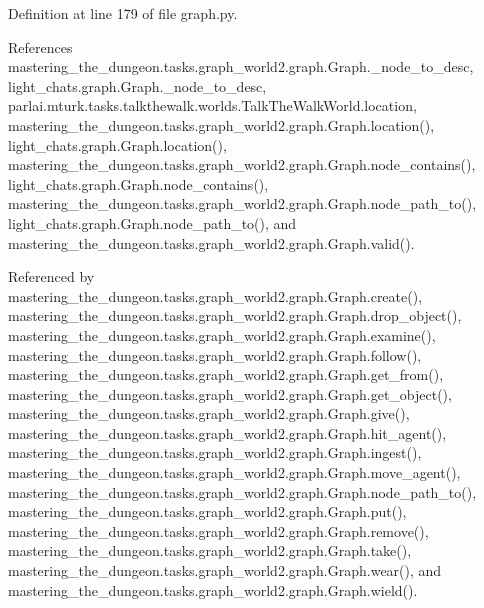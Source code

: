 Definition at line 179 of file graph.\+py.



References mastering\+\_\+the\+\_\+dungeon.\+tasks.\+graph\+\_\+world2.\+graph.\+Graph.\+\_\+node\+\_\+to\+\_\+desc, light\+\_\+chats.\+graph.\+Graph.\+\_\+node\+\_\+to\+\_\+desc, parlai.\+mturk.\+tasks.\+talkthewalk.\+worlds.\+Talk\+The\+Walk\+World.\+location, mastering\+\_\+the\+\_\+dungeon.\+tasks.\+graph\+\_\+world2.\+graph.\+Graph.\+location(), light\+\_\+chats.\+graph.\+Graph.\+location(), mastering\+\_\+the\+\_\+dungeon.\+tasks.\+graph\+\_\+world2.\+graph.\+Graph.\+node\+\_\+contains(), light\+\_\+chats.\+graph.\+Graph.\+node\+\_\+contains(), mastering\+\_\+the\+\_\+dungeon.\+tasks.\+graph\+\_\+world2.\+graph.\+Graph.\+node\+\_\+path\+\_\+to(), light\+\_\+chats.\+graph.\+Graph.\+node\+\_\+path\+\_\+to(), and mastering\+\_\+the\+\_\+dungeon.\+tasks.\+graph\+\_\+world2.\+graph.\+Graph.\+valid().



Referenced by mastering\+\_\+the\+\_\+dungeon.\+tasks.\+graph\+\_\+world2.\+graph.\+Graph.\+create(), mastering\+\_\+the\+\_\+dungeon.\+tasks.\+graph\+\_\+world2.\+graph.\+Graph.\+drop\+\_\+object(), mastering\+\_\+the\+\_\+dungeon.\+tasks.\+graph\+\_\+world2.\+graph.\+Graph.\+examine(), mastering\+\_\+the\+\_\+dungeon.\+tasks.\+graph\+\_\+world2.\+graph.\+Graph.\+follow(), mastering\+\_\+the\+\_\+dungeon.\+tasks.\+graph\+\_\+world2.\+graph.\+Graph.\+get\+\_\+from(), mastering\+\_\+the\+\_\+dungeon.\+tasks.\+graph\+\_\+world2.\+graph.\+Graph.\+get\+\_\+object(), mastering\+\_\+the\+\_\+dungeon.\+tasks.\+graph\+\_\+world2.\+graph.\+Graph.\+give(), mastering\+\_\+the\+\_\+dungeon.\+tasks.\+graph\+\_\+world2.\+graph.\+Graph.\+hit\+\_\+agent(), mastering\+\_\+the\+\_\+dungeon.\+tasks.\+graph\+\_\+world2.\+graph.\+Graph.\+ingest(), mastering\+\_\+the\+\_\+dungeon.\+tasks.\+graph\+\_\+world2.\+graph.\+Graph.\+move\+\_\+agent(), mastering\+\_\+the\+\_\+dungeon.\+tasks.\+graph\+\_\+world2.\+graph.\+Graph.\+node\+\_\+path\+\_\+to(), mastering\+\_\+the\+\_\+dungeon.\+tasks.\+graph\+\_\+world2.\+graph.\+Graph.\+put(), mastering\+\_\+the\+\_\+dungeon.\+tasks.\+graph\+\_\+world2.\+graph.\+Graph.\+remove(), mastering\+\_\+the\+\_\+dungeon.\+tasks.\+graph\+\_\+world2.\+graph.\+Graph.\+take(), mastering\+\_\+the\+\_\+dungeon.\+tasks.\+graph\+\_\+world2.\+graph.\+Graph.\+wear(), and mastering\+\_\+the\+\_\+dungeon.\+tasks.\+graph\+\_\+world2.\+graph.\+Graph.\+wield().

